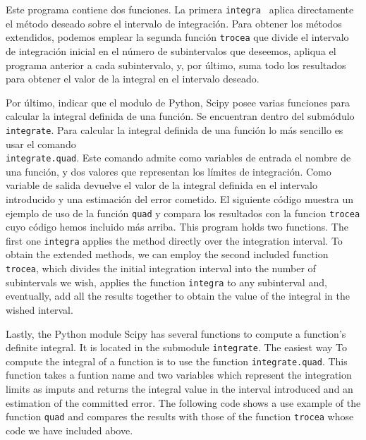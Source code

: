 \begin{paracol}{2}
Este programa contiene dos funciones. La primera \texttt{integra } aplica directamente el método deseado sobre el intervalo de integración. Para obtener los métodos extendidos, podemos emplear la segunda función \texttt{trocea} que divide el intervalo de integración inicial en el número de subintervalos que deseemos, apliqua el programa anterior a cada subintervalo, y, por último, suma todo los resultados para obtener el valor de la integral en el intervalo deseado.

Por último, indicar que el modulo de Py\-thon, Scipy  posee varias funciones para calcular la integral definida de una función. Se encuentran dentro del submódulo \texttt{integrate}. Para calcular la integral definida de una función lo más sencillo es usar el comando\\ \texttt{integrate.quad}. Este comando admite como variables de entrada el nombre de una función, y dos valores que representan los límites de integración. Como variable de salida devuelve el valor de la integral definida en el intervalo introducido y una estimación del error cometido. El siguiente código muestra un ejemplo de uso de la función \texttt{quad} y compara los resultados con la funcion \texttt{trocea} cuyo código hemos incluido más arriba.
\switchcolumn
This program holds two functions. The first one \texttt{integra} applies the method directly over the integration interval. To obtain the extended methods, we can employ the second included function \texttt{trocea}, which divides the initial integration interval into the number of subintervals we wish, applies the function \texttt{integra} to any subinterval and, eventually, add all the results together to obtain the value of the integral in the wished interval.

Lastly, the Python module Scipy has several functions to compute a function's definite integral. It is located in the submodule \texttt{integrate}. The easiest way To compute the integral of a function is to use the function \texttt{integrate.quad}. This function takes a funtion name and two variables which represent the integration limits as imputs and returns the integral value in the interval introduced and an estimation of the committed error. The following code shows a use example of the function \texttt{quad} and compares the results with those of the function \texttt{trocea} whose code we have included above. 
\end{paracol}

